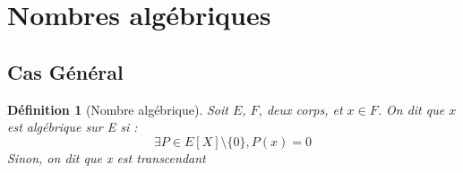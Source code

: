 \documentclass[a4paper,12pt,french,draft]{report}
\newtheorem{definition}{Définition}[section]
\begin{document}
    

		\section{Nombres algébriques}
			\subsection{Cas Général}
			\begin{definition}[Nombre algébrique]
				Soit \(E\), \(F\), deux corps,  et \(x \in F\). On dit que \(x\) est \emph{algébrique} sur E si : 
				\[
					\exists P \in E[X]\setminus\{0\} , P(x) = 0
				\]
				Sinon, on dit que x est \emph{transcendant}
			\end{definition}
			
\end{document}
